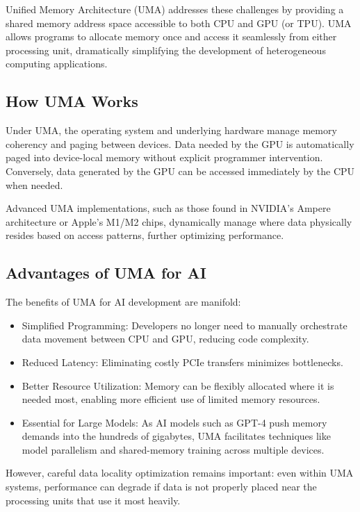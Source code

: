 \documentclass[openany]{book}
\begin{document}
Unified Memory Architecture (UMA) addresses these challenges by providing a 
shared memory address space accessible to both CPU and GPU (or TPU). UMA allows 
programs to allocate memory once and access it seamlessly from either processing 
unit, dramatically simplifying the development of heterogeneous computing 
applications.

\subsection{How UMA Works}
Under UMA, the operating system and underlying hardware manage memory coherency 
and paging between devices. Data needed by the GPU is automatically paged into 
device-local memory without explicit programmer intervention. Conversely, data 
generated by the GPU can be accessed immediately by the CPU when needed.

Advanced UMA implementations, such as those found in NVIDIA's Ampere 
architecture or Apple's M1/M2 chips, dynamically manage where data physically 
resides based on access patterns, further optimizing performance.

\subsection{Advantages of UMA for AI}
The benefits of UMA for AI development are manifold:

\begin{itemize}
    \item Simplified Programming: Developers no longer need to manually 
    orchestrate data movement between CPU and GPU, reducing code complexity.
    \item Reduced Latency: Eliminating costly PCIe transfers minimizes 
    bottlenecks.
    \item Better Resource Utilization: Memory can be flexibly allocated where it 
    is needed most, enabling more efficient use of limited memory resources.
    \item Essential for Large Models: As AI models such as GPT-4 push memory 
    demands into the hundreds of gigabytes, UMA facilitates techniques like 
    model parallelism and shared-memory training across multiple devices.
\end{itemize}

However, careful data locality optimization remains important: even within UMA 
systems, performance can degrade if data is not properly placed near the 
processing units that use it most heavily.
\end{document}
